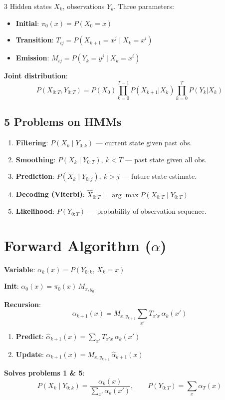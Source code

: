 \documentclass[9pt,landscape]{article}
\begin{document}
\begin{multicols}{3}
Hidden states $X_k$, observations $Y_k$. Three parameters:
\begin{itemize}
  \item \textbf{Initial}: $\pi_0(x)=P(X_0=x)$
  \item \textbf{Transition}: $T_{ij}=P(X_{k+1}=x^j\mid X_k=x^i)$
  \item \textbf{Emission}: $M_{ij}=P(Y_k=y^j\mid X_k=x^i)$
\end{itemize}

\textbf{Joint distribution}:
\[P(X_{0:T},Y_{0:T})=P(X_0)\prod_{k=0}^{T-1}P(X_{k+1}|X_k)\prod_{k=0}^T P(Y_k|X_k)\]

\subsection{5 Problems on HMMs}
\begin{enumerate}
  \item \textbf{Filtering}: $P(X_k\mid Y_{0:k})$ --- current state given past obs.
  \item \textbf{Smoothing}: $P(X_k\mid Y_{0:T}),\ k<T$ --- past state given all obs.
  \item \textbf{Prediction}: $P(X_k\mid Y_{0:j}),\ k>j$ --- future state estimate.
  \item \textbf{Decoding (Viterbi)}: $\hat X_{0:T}=\arg\max P(X_{0:T}\mid Y_{0:T})$
  \item \textbf{Likelihood}: $P(Y_{0:T})$ --- probability of observation sequence.
\end{enumerate}

\section{Forward Algorithm ($\alpha$)}

\textbf{Variable}: $\alpha_k(x)=P(Y_{0:k},\,X_k=x)$

\textbf{Init}: $\alpha_0(x)=\pi_0(x)\,M_{x,y_0}$

\textbf{Recursion}:
\[\boxed{\alpha_{k+1}(x)=M_{x,y_{k+1}}\sum_{x'}T_{x'x}\,\alpha_k(x')}\]
\begin{enumerate}
  \item \textbf{Predict}: $\hat\alpha_{k+1}(x)=\sum_{x'}T_{x'x}\,\alpha_k(x')$
  \item \textbf{Update}: $\alpha_{k+1}(x)=M_{x,y_{k+1}}\,\hat\alpha_{k+1}(x)$
\end{enumerate}

\textbf{Solves problems 1 \& 5}:
\[P(X_k\mid Y_{0:k})=\frac{\alpha_k(x)}{\sum_{x'}\alpha_k(x')}, \qquad P(Y_{0:T})=\sum_x\alpha_T(x)\]


\end{multicols}
\end{document}

